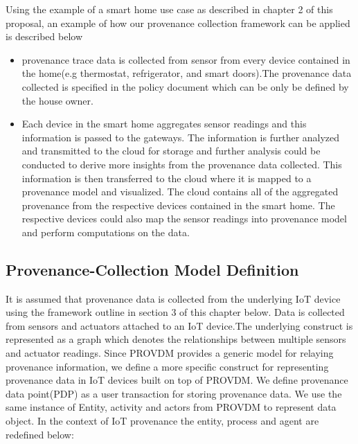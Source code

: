 Using the example of a smart home use case as described in chapter 2 of this proposal, an example of how our provenance collection framework can be applied is described below


\begin{itemize}

\item provenance trace data is collected from sensor from every device contained in the home(e.g thermostat, refrigerator, and smart doors).The  provenance data collected is specified in the policy document which can be only be defined by the house owner. 

\item Each device in the smart home aggregates sensor readings and this information is passed to the gateways. The information is further analyzed and transmitted to the cloud for storage and further analysis could be conducted to derive more insights from the provenance data collected. This information is then transferred to the cloud where it is mapped to a provenance model and visualized. The cloud contains all of the aggregated provenance from the respective devices contained in the smart home. The respective devices could also map the sensor readings into provenance model and perform computations on the data.

\end{itemize}





\subsection{Provenance-Collection Model Definition}

It is assumed that provenance data is collected from the underlying IoT device using the framework outline in section 3 of this chapter below. Data is collected from sensors and actuators attached to an IoT device.The underlying construct is represented as a graph which denotes the relationships between multiple sensors and actuator readings. Since PROV\-DM provides a generic model for relaying provenance information, we define a more specific construct for representing provenance data in IoT devices built on top of  PROV\-DM. We define provenance data point(PDP) as a user transaction for storing provenance data. We use the same instance of Entity, activity and actors from PROV\-DM to represent data object. In the context of IoT provenance the entity, process and agent are redefined below:

